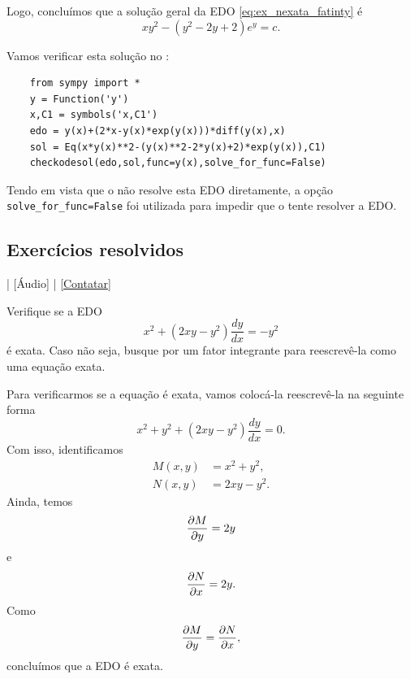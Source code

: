 \begin{ex}
  Logo, concluímos que a solução geral da EDO \eqref{eq:ex_nexata_fatinty} é
  \begin{equation}
    xy^2 - (y^2-2y+2)e^y = c.
  \end{equation}

  \ifispython
  Vamos verificar esta solução no \python:
  \begin{lstlisting}
    from sympy import *
    y = Function('y')
    x,C1 = symbols('x,C1')
    edo = y(x)+(2*x-y(x)*exp(y(x)))*diff(y(x),x)
    sol = Eq(x*y(x)**2-(y(x)**2-2*y(x)+2)*exp(y(x)),C1)
    checkodesol(edo,sol,func=y(x),solve_for_func=False)
  \end{lstlisting}
  Tendo em vista que o \sympy\;não resolve esta EDO diretamente, a opção \verb+solve_for_func=False+ foi utilizada para impedir que o \sympy\;tente resolver a EDO.
  \fi
\end{ex}

\subsection*{Exercícios resolvidos}

\begin{flushright}
  [Vídeo] | [Áudio] | \href{https://phkonzen.github.io/notas/contato.html}{[Contatar]}
\end{flushright}

\begin{exeresol}
  Verifique se a EDO
  \begin{equation}
    x^2 + (2xy-y^2)\frac{dy}{dx} = -y^2
  \end{equation}
  é exata. Caso não seja, busque por um fator integrante para reescrevê-la como uma equação exata.
\end{exeresol}
\begin{resol}
  Para verificarmos se a equação é exata, vamos colocá-la reescrevê-la na seguinte forma
  \begin{equation}
    x^2 + y^2 + (2xy-y^2)\frac{dy}{dx} = 0.
  \end{equation}
  Com isso, identificamos
  \begin{align}
    M(x,y) &= x^2 + y^2,\\
    N(x,y) &= 2xy-y^2.
  \end{align}
  Ainda, temos
  \begin{equation}
    \frac{\partial M}{\partial y} = 2y
  \end{equation}
  e
  \begin{equation}
    \frac{\partial N}{\partial x} = 2y.
  \end{equation}
  Como
  \begin{equation}
    \frac{\partial M}{\partial y} = \frac{\partial N}{\partial x},
  \end{equation}
  concluímos que a EDO é exata.
\end{resol}

